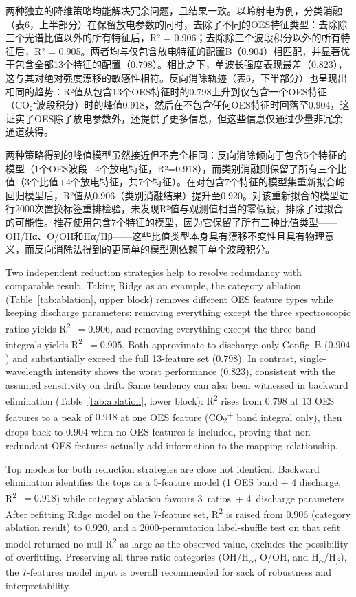 两种独立的降维策略均能解决冗余问题，且结果一致。以岭射电为例，分类消融（表6，上半部分）在保留放电参数的同时，去除了不同的OES特征类型：去除除三个光谱比值以外的所有特征后，R² = 0.906；去除除三个波段积分以外的所有特征后，R² = 0.905。两者均与仅包含放电特征的配置B（0.904）相匹配，并显著优于包含全部13个特征的配置（0.798）。相比之下，单波长强度表现最差（0.823），这与其对绝对强度漂移的敏感性相符。反向消除轨迹（表6，下半部分）也呈现出相同的趋势：R²值从包含13个OES特征时的0.798上升到仅包含一个OES特征（CO₂⁺波段积分）时的峰值0.918，然后在不包含任何OES特征时回落至0.904，这证实了OES除了放电参数外，还提供了更多信息，但这些信息仅通过少量非冗余通道获得。

两种策略得到的峰值模型虽然接近但不完全相同：反向消除倾向于包含5个特征的模型（1个OES波段+4个放电特征，R²=0.918），而类别消融则保留了所有三个比值（3个比值+4个放电特征，共7个特征）。在对包含7个特征的模型集重新拟合岭回归模型后，R²值从0.906（类别消融结果）提升至0.920。对该重新拟合的模型进行2000次置换标签重排检验，未发现R²值与观测值相当的零假设，排除了过拟合的可能性。推荐使用包含7个特征的模型，因为它保留了所有三种比值类型——OH/Hα、O/OH和Hα/Hβ——这些比值类型本身具有漂移不变性且具有物理意义，而反向消除法得到的更简单的模型则依赖于单个波段积分。


Two independent reduction strategies help to resolve redundancy with comparable result. Taking Ridge as an example, the category ablation (Table~\ref{tab:ablation}, upper block) removes different OES feature types while keeping discharge parameters: removing everything except the three spectroscopic ratios yields R\textsuperscript{2}~$=0.906$, and removing everything except the three band integrals yields R\textsuperscript{2}~$=0.905$. Both approximate to discharge-only Config~B ($0.904$) and substantially exceed the full 13-feature set ($0.798$). In contrast, single-wavelength intensity shows the worst performance ($0.823$), consistent with the assumed sensitivity on drift. Same tendency can also been witnessed in backward elimination (Table~\ref{tab:ablation}, lower block): R\textsuperscript{2} rises from $0.798$ at 13 OES features to a peak of $0.918$ at one OES feature (CO\textsubscript{2}\textsuperscript{+} band integral only), then drops back to $0.904$ when no OES features is included, proving that non-redundant OES features actually add information to the mapping relationship.

Top models for both reduction strategies are close not identical. Backward elimination identifies the tops as a 5-feature model (1 OES band + 4 discharge, R\textsuperscript{2}~$=0.918$) while category ablation favours 3~ratios~+ 4~discharge parameters. After refitting Ridge model on the 7-feature set, R\textsuperscript{2} is raised from $0.906$ (category ablation result) to $\mathbf{0.920}$, and a 2000-permutation label-shuffle test on that refit model returned no null R\textsuperscript{2} as large as the observed value, excludes the possibility of overfitting. Preserving all three ratio categories (OH/H\textsubscript{$\alpha$}, O/OH, and H\textsubscript{$\alpha$}/H\textsubscript{$\beta$}), the 7-features model input is overall recommended for sack of robustness and interpretability.

